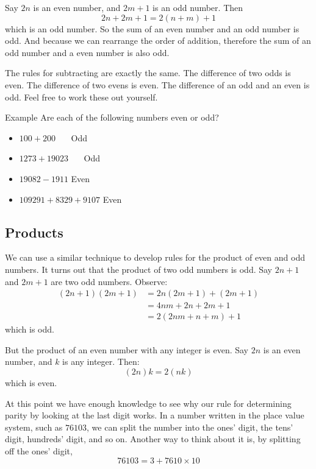 \documentclass[a4paper,10pt]{report}
\begin{document}
Say $2n$ is an even number, and $2m+1$ is an odd number. Then \[
 2n + 2m + 1 = 2(n+m) + 1
\] which is an odd number. So the sum of an even number and an odd number is
odd. And because we can rearrange the order of addition, therefore the sum of an
odd number and a even number is also odd.

The rules for subtracting are exactly the same. The difference of two odds is
even. The difference of two evens is even. The difference of an odd and an even
is odd. Feel free to work these out yourself.

\begin{problem}{Example}
 Are each of the following numbers even or odd?

 \begin{itemize}
  \item $100 + 200$ \hfill {}~~~Odd
  \item $1273 + 19023$ \hfill {}~~~Odd
  \item $19082 - 1911$ \hfill Even~~~
  \item $109291 + 8329 + 9107$ \hfill Even~~~
 \end{itemize}
\end{problem}

\subsection{Products}

We can use a similar technique to develop rules for the product of even and odd
numbers. It turns out that the product of two odd numbers is odd. Say $2n+1$
and $2m+1$ are two odd numbers. Observe: \begin{align*}
 (2n+1)(2m+1)
 &= 2n(2m+1) + (2m+1) \\
 &= 4nm+2n+2m+1 \\
 &= 2(2nm+n+m) + 1
\end{align*} which is odd.

But the product of an even number with any integer is even. Say $2n$ is an
even number, and $k$ is any integer. Then: \[
 (2n)k = 2(nk)
\] which is even.

At this point we have enough knowledge to see why our rule for determining
parity by looking at the last digit works. In a number written in the place
value system, such as $76103$, we can split the number into the ones' digit,
the tens' digit, hundreds' digit, and so on. Another way to think about it is,
by splitting off the ones' digit, \[
 76103 = 3 + 7610 \times 10
\]
\end{document}
